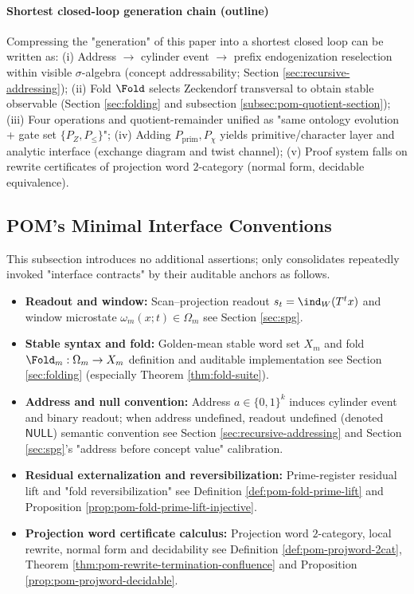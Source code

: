 \paragraph{Shortest closed-loop generation chain (outline)}
Compressing the "generation" of this paper into a shortest closed loop can be written as:
(i) Address \(\to\) cylinder event \(\to\) prefix endogenization reselection within visible \(\sigma\)-algebra (concept addressability; Section \ref{sec:recursive-addressing});
(ii) Fold \(\Fold\) selects Zeckendorf transversal to obtain stable observable (Section \ref{sec:folding} and subsection \ref{subsec:pom-quotient-section});
(iii) Four operations and quotient-remainder unified as "same ontology evolution + gate set \(\{P_Z,P_{\le}\}\)";
(iv) Adding \(P_{\mathrm{prim}},P_\chi\) yields primitive/character layer and analytic interface (exchange diagram and twist channel);
(v) Proof system falls on rewrite certificates of projection word \(2\)-category (normal form, decidable equivalence).

\subsection{POM's Minimal Interface Conventions}\label{subsec:pom-min}
This subsection introduces no additional assertions; only consolidates repeatedly invoked "interface contracts" by their auditable anchors as follows.
\begin{itemize}
  \item \textbf{Readout and window:} Scan–projection readout \(s_t=\ind_W(T^t x)\) and window microstate \(\omega_m(x;t)\in\Omega_m\) see Section \ref{sec:spg}.
  \item \textbf{Stable syntax and fold:} Golden-mean stable word set \(X_m\) and fold \(\Fold_m:\Omega_m\to X_m\) definition and auditable implementation see Section \ref{sec:folding} (especially Theorem \ref{thm:fold-suite}).
  \item \textbf{Address and null convention:} Address \(a\in\{0,1\}^k\) induces cylinder event and binary readout; when address undefined, readout undefined (denoted \(\mathsf{NULL}\)) semantic convention see Section \ref{sec:recursive-addressing} and Section \ref{sec:spg}'s "address before concept value" calibration.
  \item \textbf{Residual externalization and reversibilization:} Prime-register residual lift and "fold reversibilization" see Definition \ref{def:pom-fold-prime-lift} and Proposition \ref{prop:pom-fold-prime-lift-injective}.
  \item \textbf{Projection word certificate calculus:} Projection word \(2\)-category, local rewrite, normal form and decidability see Definition \ref{def:pom-projword-2cat}, Theorem \ref{thm:pom-rewrite-termination-confluence} and Proposition \ref{prop:pom-projword-decidable}.
\end{itemize}

